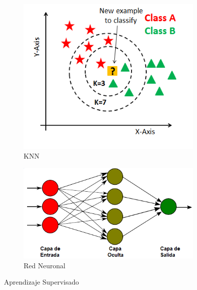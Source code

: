 \begin{figure}[!h]
	\centering
	
	
	\begin{subfigure}[t]{0.33\textwidth}
		\centering
		\includegraphics[width=\textwidth]{images/chapter_2/knn}
		\caption{KNN}
		\label{fig:knn}
	\end{subfigure}
	\hfill
	\begin{subfigure}[t]{0.48\textwidth}
		\centering
		\includegraphics[width=\textwidth]{images/chapter_2/redneu}
		\caption{Red Neuronal}
		\label{fig:redneu}
	\end{subfigure}
	
	\caption{Aprendizaje Supervisado}
	\label{fig:aprendizajeSupervisado}
\end{figure}

\newpage









